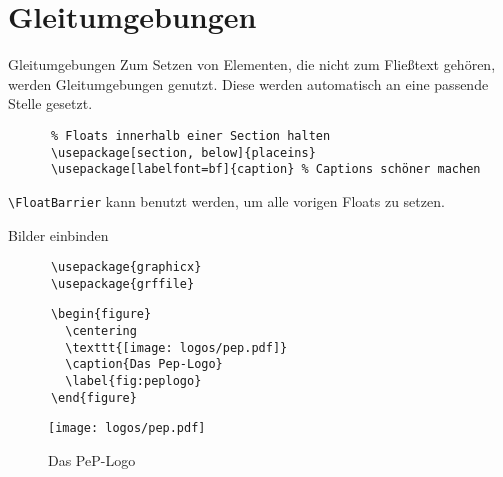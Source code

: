 \section{Gleitumgebungen}

\begin{frame}[fragile]{Gleitumgebungen}
  Zum Setzen von Elementen, die nicht zum Fließtext gehören, werden Gleitumgebungen genutzt.
  Diese werden automatisch an eine passende Stelle gesetzt.

  \begin{Packages}
    \begin{lstlisting}
      % Floats innerhalb einer Section halten
      \usepackage[section, below]{placeins}
      \usepackage[labelfont=bf]{caption} % Captions schöner machen
    \end{lstlisting}
  \end{Packages}

  \lstinline+\FloatBarrier+ kann benutzt werden, um alle vorigen Floats zu setzen.
\end{frame}

\begin{frame}[fragile]{Bilder einbinden}
  \begin{Packages}
    \begin{lstlisting}
      \usepackage{graphicx}
      \usepackage{grffile}
    \end{lstlisting}
  \end{Packages}
  \begin{CodeExample}{0.60}
    \begin{lstlisting}
      \begin{figure}
        \centering
        \texttt{[image: logos/pep.pdf]}
        \caption{Das Pep-Logo}
        \label{fig:peplogo}
      \end{figure}
    \end{lstlisting}
  \CodeResult
    \begin{figure}
      \centering
      \texttt{[image: logos/pep.pdf]}
      \caption{Das PeP-Logo}
      \label{fig:peplogo}
    \end{figure}
  \end{CodeExample}
\end{frame}
